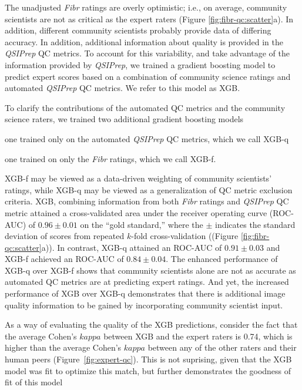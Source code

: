 \documentclass[fleqn,10pt]{wlscirep}
\begin{document}
The unadjusted \emph{Fibr} ratings are overly optimistic; i.e., on average,
community scientists are not as critical as the expert raters (Figure
\ref{fig:fibr-qc:scatter}a). In addition, different community scientists
probably provide data of differing accuracy. In addition, additional information
about quality is provided in the \emph{QSIPrep} QC metrics. To account for this
variability, and take advantage of the information provided by \emph{QSIPrep},
we trained a gradient boosting model \cite{chen2016-eb} to predict expert scores
based on a combination of community science ratings and automated \emph{QSIPrep}
QC metrics. We refer to this model as XGB.

To clarify the contributions of the automated QC metrics and the community
science raters, we trained two additional gradient boosting models
\begin{enumerate*}[%
    label=(\roman*),%
    before=\unskip{: },%
    itemjoin={{, }},%
    itemjoin*={{ and }}]
    \item one trained only on the automated \emph{QSIPrep} QC metrics, which we
    call XGB-q
    \item one trained on only the \emph{Fibr} ratings, which we call XGB-f.
\end{enumerate*}

XGB-f may be viewed as a data-driven weighting of community scientists' ratings,
while XGB-q may be viewed as a generalization of QC metric exclusion criteria.
XGB, combining information from both \emph{Fibr} ratings and \emph{QSIPrep} QC
metric attained a cross-validated area under the receiver operating curve
(ROC-AUC) of $0.96 \pm 0.01$ on the ``gold standard,'' where the $\pm$ indicates
the standard deviation of scores from repeated $k$-fold cross-validation
((Figure \ref{fig:fibr-qc:scatter}a)). In contrast, XGB-q attained an ROC-AUC of
$0.91 \pm 0.03$ and XGB-f achieved an ROC-AUC of $0.84 \pm 0.04$. The enhanced
performance of XGB-q over XGB-f shows that community scientists alone are not as
accurate as automated QC metrics are at predicting expert ratings. And yet, the
increased performance of XGB over XGB-q demonstrates that there is additional
image quality information to be gained by incorporating community scientist input.

As a way of evaluating the quality of the XGB predictions, consider the fact
that the average Cohen's $kappa$ between XGB and the expert raters is 0.74,
which is higher than the average Cohen's $kappa$ between any of the other raters
and their human peers (Figure~\ref{fig:expert-qc}). This is not suprising,
given that the XGB model was fit to optimize this match, but further
demonstrates the goodness of fit of this model
\end{document}
